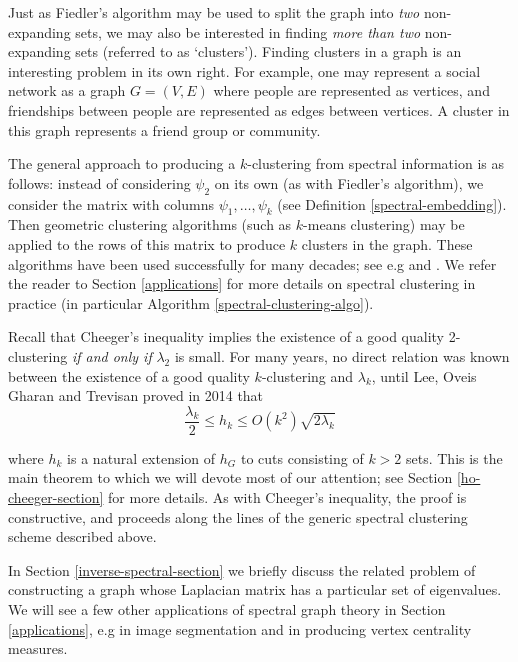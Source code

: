 \documentclass[a4paper,11pt]{article}
\theoremstyle{definition}
\begin{document}
\medskip

Just as Fiedler's algorithm may be used to split the graph into \emph{two} non-expanding sets, we may also be interested in finding \emph{more than two} non-expanding sets (referred to as `clusters'). Finding clusters in a graph is an interesting problem in its own right. For example, one may represent a social network as a graph $G = (V, E)$ where people are represented as vertices, and friendships between people are represented as edges between vertices. A cluster in this graph represents a friend group or community.

\medskip

The general approach to producing a $k$-clustering from spectral information is as follows: instead of considering $\psi_2$ on its own (as with Fiedler's algorithm), we consider the matrix with columns $\psi_1, \dots, \psi_k$ (see Definition \ref{spectral-embedding}). Then geometric clustering algorithms (such as $k$-means clustering) may be applied to the rows of this matrix to produce $k$ clusters in the graph. These algorithms have been used successfully for many decades; see e.g \cite{shimalik} and \cite{hoffmandonath}. We refer the reader to Section \ref{applications} for more details on spectral clustering in practice (in particular Algorithm \ref{spectral-clustering-algo}).

\medskip

Recall that Cheeger's inequality implies the existence of a good quality 2-clustering \emph{if and only if} $\lambda_2$ is small. For many years, no direct relation was known between the existence of a good quality $k$-clustering and $\lambda_k$, until Lee, Oveis Gharan and Trevisan \cite{main} proved in 2014 that
\[
\frac{\lambda_k}{2} \le h_k \le O(k^2) \sqrt{2\lambda_k}
\]

where $h_k$ is a natural extension of $h_G$ to cuts consisting of $k > 2$ sets. This is the main theorem to which we will devote most of our attention; see Section \ref{ho-cheeger-section} for more details. As with Cheeger's inequality, the proof is constructive, and proceeds along the lines of the generic spectral clustering scheme described above.

\medskip

In Section \ref{inverse-spectral-section} we briefly discuss the related problem of constructing a graph whose Laplacian matrix has a particular set of eigenvalues. We will see a few other applications of spectral graph theory in Section \ref{applications}, e.g in image segmentation and in producing vertex centrality measures.
\end{document}
